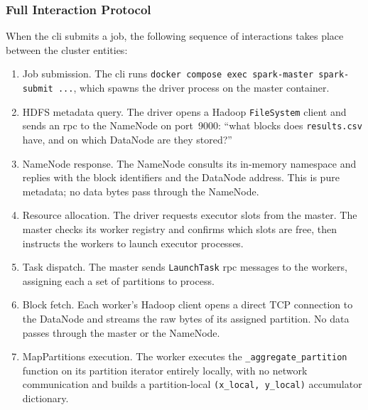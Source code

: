 \subsubsection{Full Interaction Protocol}
\label{subsubsec:interaction-protocol}

When the \gls{cli} submits a job, the following sequence of interactions takes place between
the cluster entities:

\begin{sloppypar}
\begin{enumerate}
    \item Job submission.  The \gls{cli} runs
          \texttt{docker compose exec spark-master spark-\allowbreak{}submit ...}, which spawns the driver
          process on the master container.

    \item HDFS metadata query.  The driver opens a Hadoop \texttt{FileSystem} client
          and sends an \gls{rpc} to the NameNode on port~9000: ``what blocks does
          \texttt{results.csv} have, and on which DataNode are they stored?''

    \item NameNode response.  The NameNode consults its in-memory namespace and
          replies with the block identifiers and the DataNode address.  This is pure metadata;
          no data bytes pass through the NameNode.

    \item Resource allocation.  The driver requests executor slots from the master.
          The master checks its worker registry and confirms which slots are free, then
          instructs the workers to launch executor processes.

    \item Task dispatch.  The master sends \texttt{LaunchTask} \gls{rpc} messages to
          the workers, assigning each a set of partitions to process.

    \item Block fetch.  Each worker's Hadoop client opens a direct TCP
          connection to the DataNode and streams the raw bytes of its assigned partition.
          No data passes through the master or the NameNode.

    \item MapPartitions execution.  The worker executes the
          \texttt{\_aggregate\_partition} function on its partition iterator entirely
          locally, with no network communication and builds a partition-local
          \texttt{(x\_local, y\_local)} accumulator dictionary.


\end{enumerate}
\end{sloppypar}
